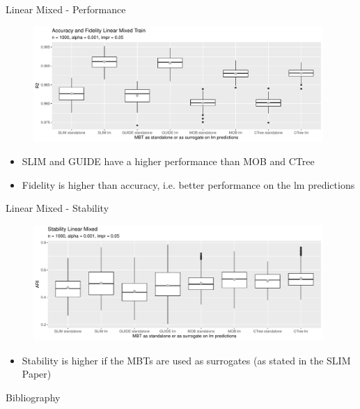 \documentclass[9pt, xcolor=table]{beamer}
\begin{document}
\begin{frame}{Linear Mixed - Performance}

\begin{figure}
    \includegraphics[width=11cm]{Figures/simulations/batchtools/basic_scenarios/linear_mixed/lm_1000_standalone_lm_r2_train.pdf}
\end{figure}  
\begin{itemize}
    \item SLIM and GUIDE have a higher performance than MOB and CTree
    \item Fidelity is higher than accuracy, i.e. better performance on the lm predictions
\end{itemize}
\end{frame}

\begin{frame}{Linear Mixed - Stability}

\begin{figure}
    \includegraphics[width=11cm]{Figures/simulations/batchtools/basic_scenarios/linear_mixed/lm_1000_standalone_lm_sta.pdf}
\end{figure}     
\begin{itemize}
    \item Stability is higher if the MBTs are used as surrogates (as stated in the SLIM Paper)
\end{itemize}

\end{frame}


\begin{frame}{Bibliography}
    
    

\end{frame}
\end{document}
